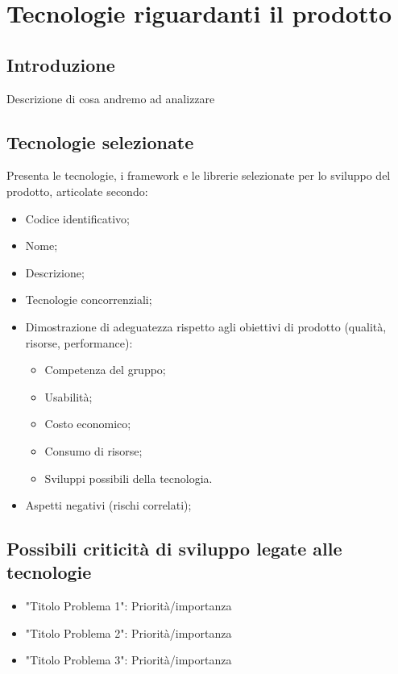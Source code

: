 \documentclass[./../Technology Baseline.tex]{subfiles}
\begin{document}
	
\chapter{Tecnologie riguardanti il prodotto}

\section{Introduzione}
Descrizione di cosa andremo ad analizzare

\section{Tecnologie selezionate}
Presenta le tecnologie, i framework e le librerie
selezionate per lo sviluppo del prodotto, articolate secondo:

\begin{itemize}
	\item Codice identificativo;
	\item Nome;
	\item Descrizione;
	\item Tecnologie concorrenziali;
	\item Dimostrazione di adeguatezza rispetto agli obiettivi di prodotto (qualità, risorse, performance):
		\begin{itemize}
			\item Competenza del gruppo;
			\item Usabilità;
			\item Costo economico;
			\item Consumo di risorse;
			\item Sviluppi possibili della tecnologia.
		\end{itemize}
	\item Aspetti negativi (rischi correlati);
\end{itemize}

\section{Possibili criticità di sviluppo legate alle tecnologie}
\begin{itemize}
	\item{"Titolo Problema 1": } Priorità/importanza
	\item{"Titolo Problema 2": } Priorità/importanza
	\item{"Titolo Problema 3": } Priorità/importanza
\end{itemize}
\end{document}
